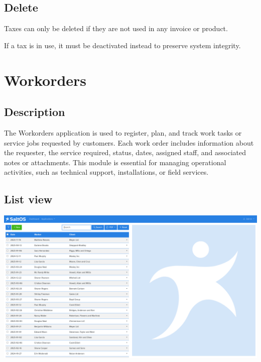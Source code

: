 \documentclass[a4paper]{article}
\begin{document}
\hypertarget{toc170}{}
\subsection{Delete}

Taxes can only be deleted if they are not used in any invoice or product.

If a tax is in use, it must be deactivated instead to preserve system integrity.


\hypertarget{toc171}{}
\section{Workorders}

\hypertarget{toc172}{}
\subsection{Description}

The Workorders application is used to register, plan, and track work tasks or service jobs requested by customers.
Each work order includes information about the requester, the service required, status, dates, assigned staff,
and associated notes or attachments. This module is essential for managing operational activities,
such as technical support, installations, or field services.

\hypertarget{toc173}{}
\subsection{List view}

\begin{center}\includegraphics[width=1\textwidth]{../ujest/snaps/test-screenshots-js-screenshots-sales-workorders-list-en-us-1-snap.png}\end{center}
\end{document}
